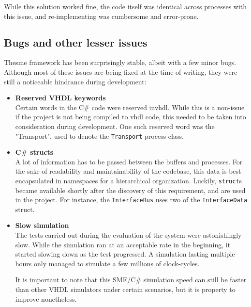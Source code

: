 While this solution worked fine, the code itself was identical across processes
with this issue, and re-implementing was cumbersome and error-prone.

\subsection{Bugs and other lesser issues}
The\gls{sme} framework has been surprisingly stable, albeit with a few minor
bugs. Although most of these issues are being fixed at the time of writing,
they were still a noticeable hindrance during development:
\begin{itemize}
\item \textbf{Reserved VHDL keywords}\\
Certain words in the C\# code were reserved in\gls{vhdl}. While this is a
non-issue if the project is not being compiled to \gls{vhdl} code, this needed
to be taken into consideration during development. One such reserved word  was
the "Transport", used to denote the \texttt{Transport} process class.

\item \textbf{C\# structs}\\
A lot of information has to be passed between the buffers and processes. For
the sake of readability and maintainability of the codebase, this data is best
encapsulated in namespaces for a hierarchical organization.
Luckily, \texttt{struct}s became available shortly after the discovery of this
requirement, and are used in the project. For instance, the
\texttt{InterfaceBus} uses two of the \texttt{InterfaceData} struct.

\item \textbf{Slow simulation}\\
The tests carried out during the evaluation of the system were astonishingly
slow. While the simulation ran at an acceptable rate in the beginning, it
started slowing down as the test progressed. A simulation lasting multiple
hours only managed to simulate a few millions of clock-cycles.

It is important to note that this SME/C\# simulation speed can still be faster
than other VHDL simulators under certain scenarios, but it is property to
improve nonetheless.


\end{itemize}


